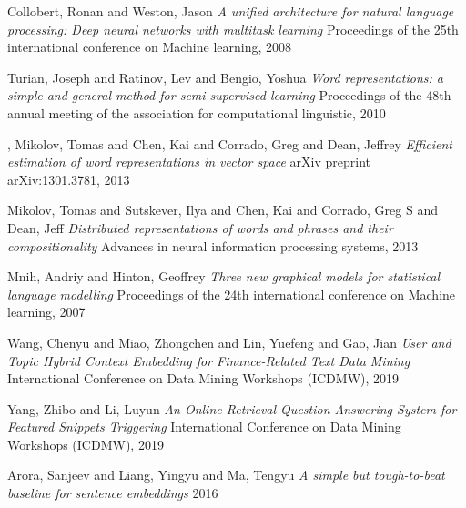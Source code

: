 \begin{thebibliography}{9}
Collobert, Ronan and Weston, Jason\newline
\textit{A unified architecture for natural language processing: Deep neural networks with multitask learning}\newline
Proceedings of the 25th international conference on Machine learning, 2008

Turian, Joseph and Ratinov, Lev and Bengio, Yoshua\newline
\textit{Word representations: a simple and general method for semi-supervised learning}\newline
Proceedings of the 48th annual meeting of the association for computational linguistic, 2010

,
Mikolov, Tomas and Chen, Kai and Corrado, Greg and Dean, Jeffrey\newline
\textit{Efficient estimation of word representations in vector space}\newline
arXiv preprint arXiv:1301.3781, 2013

Mikolov, Tomas and Sutskever, Ilya and Chen, Kai and Corrado, Greg S and Dean, Jeff\newline
\textit{Distributed representations of words and phrases and their compositionality}\newline
Advances in neural information processing systems, 2013

Mnih, Andriy and Hinton, Geoffrey\newline
\textit{Three new graphical models for statistical language modelling}\newline
Proceedings of the 24th international conference on Machine learning, 2007

Wang, Chenyu and Miao, Zhongchen and Lin, Yuefeng and Gao, Jian\newline
\textit{User and Topic Hybrid Context Embedding for Finance-Related Text Data Mining} International Conference on Data Mining Workshops (ICDMW), 2019

Yang, Zhibo and Li, Luyun\newline
\textit{An Online Retrieval Question Answering System for Featured Snippets Triggering} International Conference on Data Mining Workshops (ICDMW), 2019

Arora, Sanjeev and Liang, Yingyu and Ma, Tengyu\newline
\textit{A simple but tough-to-beat baseline for sentence embeddings}
2016


\end{thebibliography}
